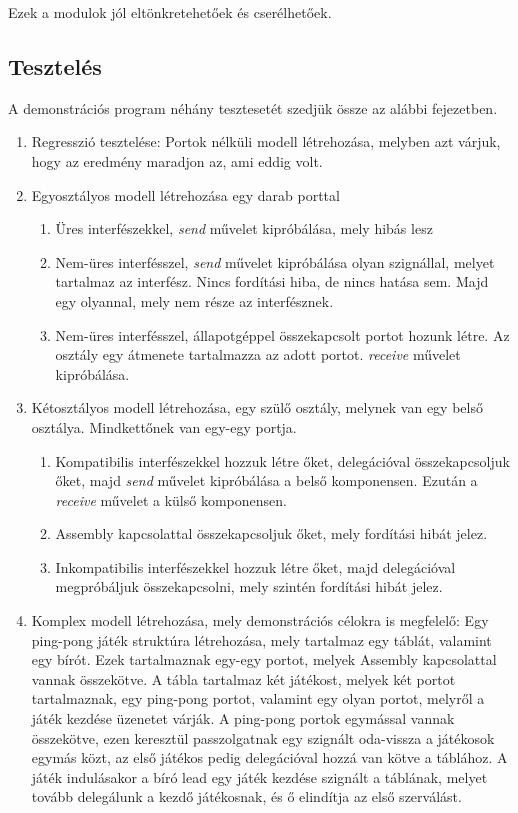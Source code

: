 \documentclass[a4paper,12pt]{report}
\begin{document}
Ezek a modulok jól eltönkretehetőek és cserélhetőek. 

\subsection{Tesztelés}
A demonstrációs program néhány tesztesetét szedjük össze az alábbi fejezetben.

\begin{enumerate}
\item Regresszió tesztelése: Portok nélküli modell létrehozása, melyben azt várjuk, hogy az eredmény maradjon az, ami eddig volt.
\item Egyosztályos modell létrehozása egy darab porttal
\begin{enumerate}
\item Üres interfészekkel, \textit{send} művelet kipróbálása, mely hibás lesz
\item Nem-üres interfésszel, \textit{send} művelet kipróbálása olyan szignállal, melyet tartalmaz az interfész. Nincs fordítási hiba, de nincs hatása sem. Majd egy olyannal, mely nem része az interfésznek.
\item Nem-üres interfésszel, állapotgéppel összekapcsolt portot hozunk létre. Az osztály egy átmenete tartalmazza az adott portot. \textit{receive} művelet kipróbálása.
\end{enumerate}
\item Kétosztályos modell létrehozása, egy szülő osztály, melynek van egy belső osztálya. Mindkettőnek van egy-egy portja.
\begin{enumerate}
\item Kompatibilis interfészekkel hozzuk létre őket, delegációval összekapcsoljuk őket, majd \textit{send} művelet kipróbálása a belső komponensen. Ezután a \textit{receive} művelet a külső komponensen.
\item Assembly kapcsolattal összekapcsoljuk őket, mely fordítási hibát jelez.
\item Inkompatibilis interfészekkel hozzuk létre őket, majd delegációval megpróbáljuk összekapcsolni, mely szintén fordítási hibát jelez.
\end{enumerate}
\item Komplex modell létrehozása, mely demonstrációs célokra is megfelelő: Egy ping-pong játék struktúra létrehozása, mely tartalmaz egy táblát, valamint egy bírót. Ezek tartalmaznak egy-egy portot, melyek Assembly kapcsolattal vannak összekötve. A tábla tartalmaz két játékost, melyek két portot tartalmaznak, egy ping-pong portot, valamint egy olyan portot, melyről a játék kezdése üzenetet várják. A ping-pong portok egymással vannak összekötve, ezen keresztül passzolgatnak egy szignált oda-vissza a játékosok egymás közt, az első játékos pedig delegációval hozzá van kötve a táblához. A játék indulásakor a bíró lead egy játék kezdése szignált a táblának, melyet tovább delegálunk a kezdő játékosnak, és ő elindítja az első szerválást.
\end{enumerate}
\end{document}
